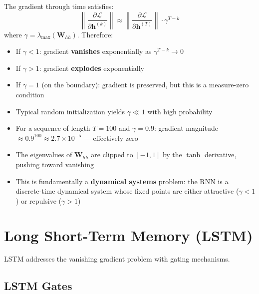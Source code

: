 \begin{theorem}
The gradient through time satisfies:
\begin{equation}
\left\| \frac{\partial \mathcal{L}}{\partial \mathbf{h}^{(k)}} \right\| \approx \left\| \frac{\partial \mathcal{L}}{\partial \mathbf{h}^{(T)}} \right\| \cdot \gamma^{T-k}
\end{equation}
where $\gamma = \lambda_{\max}(\mathbf{W}_{hh})$. Therefore:
\begin{itemize}
    \item If $\gamma < 1$: gradient \textbf{vanishes} exponentially as $\gamma^{T-k} \to 0$
    \item If $\gamma > 1$: gradient \textbf{explodes} exponentially
    \item If $\gamma = 1$ (on the boundary): gradient is preserved, but this is a measure-zero condition
\end{itemize}
\end{theorem}

\begin{properties}
\begin{itemize}
    \item Typical random initialization yields $\gamma \ll 1$ with high probability \cite{bengio1994learning}
    \item For a sequence of length $T = 100$ and $\gamma = 0.9$: gradient magnitude $\approx 0.9^{100} \approx 2.7 \times 10^{-5}$ --- effectively zero
    \item The eigenvalues of $\mathbf{W}_{hh}$ are clipped to $[-1, 1]$ by the $\tanh$ derivative, pushing toward vanishing
    \item This is fundamentally a \textbf{dynamical systems} problem: the RNN is a discrete-time dynamical system whose fixed points are either attractive ($\gamma < 1$) or repulsive ($\gamma > 1$)
\end{itemize}
\end{properties}

\section{Long Short-Term Memory (LSTM)}

LSTM \cite{hochreiter1997long} addresses the vanishing gradient problem with gating mechanisms.

\subsection{LSTM Gates}


